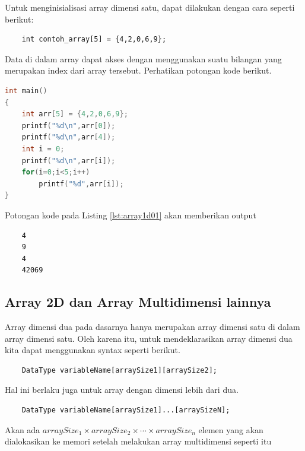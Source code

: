 Untuk menginisialisasi array dimensi satu, dapat dilakukan dengan cara seperti berikut:
\begin{verbatim}
    int contoh_array[5] = {4,2,0,6,9};
\end{verbatim}

Data di dalam array dapat akses dengan menggunakan suatu bilangan yang merupakan index dari array tersebut. Perhatikan potongan kode berikut.

\begin{lstlisting}[language=c,caption = Contoh Mengakses Array 1D,label=lst:array1d01]
int main()
{
    int arr[5] = {4,2,0,6,9};
    printf("%d\n",arr[0]);
    printf("%d\n",arr[4]);
    int i = 0;
    printf("%d\n",arr[i]);
    for(i=0;i<5;i++)
        printf("%d",arr[i]);
}
\end{lstlisting}

Potongan kode pada Listing \ref{lst:array1d01} akan memberikan output
\begin{verbatim}
    4
    9
    4
    42069
\end{verbatim}

\subsection{Array 2D dan Array Multidimensi lainnya}%
Array dimensi dua pada dasarnya hanya merupakan array dimensi satu di dalam array dimensi satu. Oleh karena itu, untuk mendeklarasikan array dimensi dua kita dapat menggunakan syntax seperti berikut.
\begin{verbatim}
	DataType variableName[arraySize1][arraySize2];
\end{verbatim}
Hal ini berlaku juga untuk array dengan dimensi lebih dari dua.
\begin{verbatim}
    DataType variableName[arraySize1]...[arraySizeN];
\end{verbatim}
Akan ada $arraySize_1\times arraySize_2 \times \cdots \times arraySize_n$ elemen yang akan dialokasikan ke memori setelah melakukan array multidimensi seperti itu

